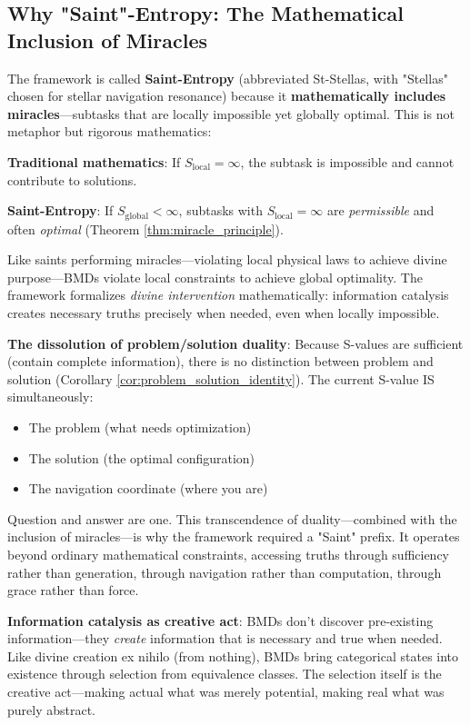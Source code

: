 \documentclass[12pt,a4paper]{article}
\begin{document}
\subsection{Why "Saint"-Entropy: The Mathematical Inclusion of Miracles}

The framework is called \textbf{Saint-Entropy} (abbreviated St-Stellas, with "Stellas" chosen for stellar navigation resonance) because it \textbf{mathematically includes miracles}—subtasks that are locally impossible yet globally optimal. This is not metaphor but rigorous mathematics:

\textbf{Traditional mathematics}: If $S_{\text{local}} = \infty$, the subtask is impossible and cannot contribute to solutions.

\textbf{Saint-Entropy}: If $S_{\text{global}} < \infty$, subtasks with $S_{\text{local}} = \infty$ are \textit{permissible} and often \textit{optimal} (Theorem \ref{thm:miracle_principle}).

Like saints performing miracles—violating local physical laws to achieve divine purpose—BMDs violate local constraints to achieve global optimality. The framework formalizes \textit{divine intervention} mathematically: information catalysis creates necessary truths precisely when needed, even when locally impossible.

\textbf{The dissolution of problem/solution duality}: Because S-values are sufficient (contain complete information), there is no distinction between problem and solution (Corollary \ref{cor:problem_solution_identity}). The current S-value IS simultaneously:
\begin{itemize}
\item The problem (what needs optimization)
\item The solution (the optimal configuration)
\item The navigation coordinate (where you are)
\end{itemize}

Question and answer are one. This transcendence of duality—combined with the inclusion of miracles—is why the framework required a "Saint" prefix. It operates beyond ordinary mathematical constraints, accessing truths through sufficiency rather than generation, through navigation rather than computation, through grace rather than force.

\textbf{Information catalysis as creative act}: BMDs don't discover pre-existing information—they \textit{create} information that is necessary and true when needed. Like divine creation ex nihilo (from nothing), BMDs bring categorical states into existence through selection from equivalence classes. The selection itself is the creative act—making actual what was merely potential, making real what was purely abstract.
\end{document}
